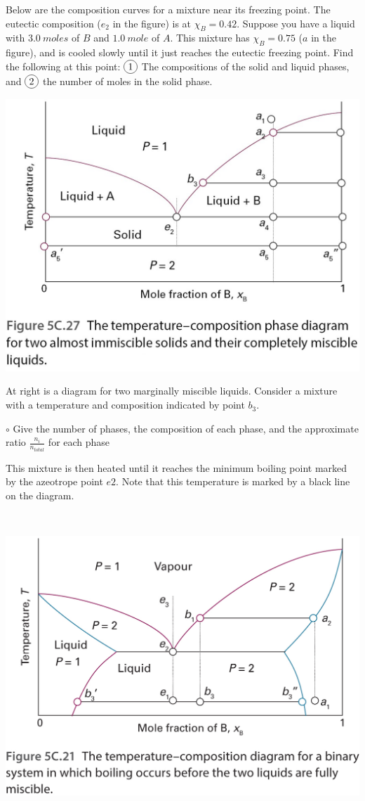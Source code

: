 \documentclass[11pt, letterpaper]{memoir}
\begin{document}
{\vspace{2em}\noindent
Below are the composition curves for a mixture near its freezing point. The eutectic composition ($e_2$ in the figure) is at $\chi_B = 0.42$. Suppose you have a liquid with $3.0~moles$ of $B$ and $1.0~mole$ of $A$. This mixture has $\chi_B=0.75$ ($a$ in the figure), and is cooled slowly until it just reaches the eutectic freezing point. Find the following at this point: $\circled{1}$ The compositions of the solid and liquid phases, and $\circled{2}$ the number of moles in the solid phase.

\noindent\includegraphics[width=0.6\linewidth]{Eutectic}

\vspace{2em}\noindent
\begin{minipage}{0.55\textwidth}
	\noindent At right is a diagram for two marginally miscible liquids. Consider a mixture with a temperature and composition indicated by point $b_3$.

	\noindent  $\circ$ Give the number of phases, the composition of each phase, and the approximate ratio $\frac{n_i}{n_{total}}$ for each phase
		
	\vspace{4em}
	\noindent This mixture is then heated until it reaches the minimum boiling point marked by the azeotrope point $e2$. Note that this temperature is marked by a black line on the diagram. 
	

\end{minipage} ~~
\begin{minipage}{0.55\textwidth}
	\noindent\includegraphics[width=\linewidth]{Bunny_Ears}
\end{minipage}

}
\end{document}
